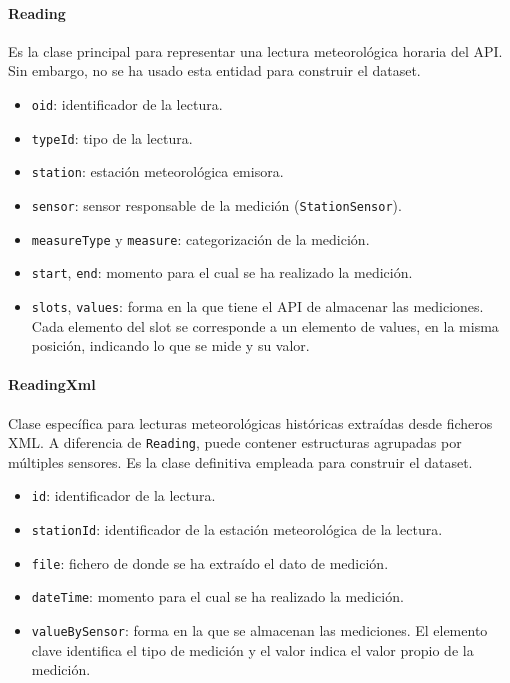 \vspace{1em}
\paragraph*{Reading}
Es la clase principal para representar una lectura meteorológica horaria del API. Sin embargo, no se ha usado esta entidad para construir el dataset.
\begin{itemize}
	\item \texttt{oid}: identificador de la lectura.
	\item \texttt{typeId}: tipo de la lectura.
	\item \texttt{station}: estación meteorológica emisora.
	\item \texttt{sensor}: sensor responsable de la medición (\texttt{StationSensor}).
	\item \texttt{measureType} y \texttt{measure}: categorización de la medición.
	\item \texttt{start}, \texttt{end}: momento para el cual se ha realizado la medición.
	\item \texttt{slots}, \texttt{values}: forma en la que tiene el API de almacenar las mediciones. Cada elemento del slot se corresponde a un elemento de values, en la misma posición, indicando lo que se mide y su valor.
\end{itemize}

\paragraph*{ReadingXml}
Clase específica para lecturas meteorológicas históricas extraídas desde ficheros XML. A diferencia de \texttt{Reading}, puede contener estructuras agrupadas por múltiples sensores. Es la clase definitiva empleada para construir el dataset.
\begin{itemize}
	\item \texttt{id}: identificador de la lectura.
	\item \texttt{stationId}: identificador de la estación meteorológica de la lectura.
	\item \texttt{file}: fichero de donde se ha extraído el dato de medición.
	\item \texttt{dateTime}: momento para el cual se ha realizado la medición.
	\item \texttt{valueBySensor}: forma en la que se almacenan las mediciones. El elemento clave identifica el tipo de medición y el valor indica el valor propio de la medición.
\end{itemize}

